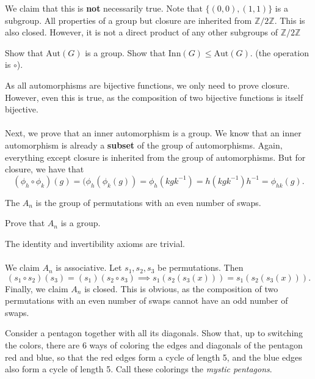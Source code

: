 \documentclass{scrartcl}
\begin{document}
\begin{soln}
    We claim that this is \textbf{not} necessarily true. Note that $\{(0, 0), (1, 1)\}$ is a subgroup. All properties of a group but closure are inherited from $\mathbb{Z} / 2\mathbb{Z}$. This is also closed. However, it is not a direct product of any other subgroups of $\mathbb{Z} / 2\mathbb{Z}$
\end{soln}

\begin{problem}[11]
    Show that $\text{Aut}(G)$ is a group. Show that $\text{Inn}(G) \le \text{Aut}(G).$ (the operation is $\circ$).
\end{problem}

\begin{soln}
    As all automorphisms are bijective functions, we only need to prove closure. However, even this is true, as the composition of two bijective functions is itself bijective. \\ \\
    Next, we prove that an inner automorphism is a group. We know that an inner automorphism is already a \textbf{subset} of the group of automorphisms. Again, everything except closure is inherited from the group of automorphisms. But for closure, we have that
    $$(\phi_h \circ \phi_k)(g) = (\phi_h(\phi_k(g)) = \phi_h(kgk^{-1}) = h(kgk^{-1})h^{-1} = \phi_{hk}(g).$$
\end{soln}

\begin{definition}
    The  $A_n$ is the group of permutations with an even number of swaps.
\end{definition}

\begin{problem}[15]
    Prove that $A_n$ is a group.
\end{problem}

\begin{soln}
    The identity and invertibility axioms are trivial. \\
    \\
    We claim $A_n$ is associative. Let $s_1, s_2, s_3$ be permutations. Then $$(s_1 \circ s_2) (s_3) = (s_1) (s_2 \circ s_3) \implies s_1(s_2(s_3(x))) = s_1(s_2(s_3(x))).$$
    Finally, we claim $A_n$ is closed. This is obvious, as the composition of two permutations with an even number of swaps cannot have an odd number of swaps.
\end{soln}

\begin{problem}[23]
	Consider a pentagon together with all its diagonals. Show that, up to switching the colors, there are 6 ways of coloring the edges and diagonals of the pentagon red and blue, so that the red edges form a cycle of length 5, and the blue edges also form a cycle of length 5. Call these colorings the \textit{mystic pentagons}.
\end{problem}
\end{document}
